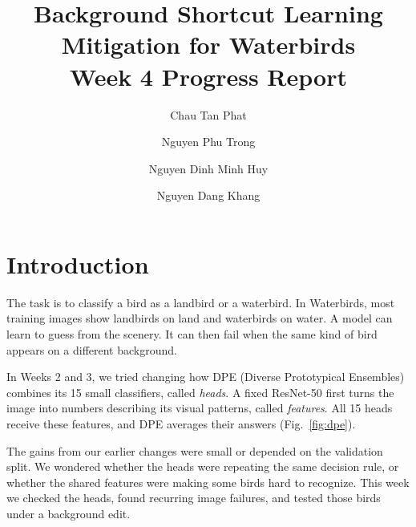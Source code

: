 \documentclass[runningheads]{llncs}
\makeatletter
\newenvironment{methodfigure}{\par\medskip\noindent
  \begin{minipage}{\linewidth}\centering\def\@captype{figure}}
  {\end{minipage}\par\medskip}
\makeatother
\begin{document}
\title{Background Shortcut Learning Mitigation for Waterbirds\texorpdfstring{\\}{: }
Week 4 Progress Report}
\author{Chau Tan Phat \and
Nguyen Phu Trong \and
Nguyen Dinh Minh Huy \and
Nguyen Dang Khang}
\maketitle
\raggedbottom

\section{Introduction}

The task is to classify a bird as a landbird or a waterbird. In Waterbirds,
most training images show landbirds on land and waterbirds on water.
A model can learn to guess from the scenery. It can then fail when the
same kind of bird appears on a different background.

In Weeks 2 and 3, we tried changing how DPE (Diverse Prototypical Ensembles)
combines its 15 small classifiers, called \emph{heads}. A fixed ResNet-50
first turns the image into numbers describing its visual patterns,
called \emph{features}. All 15 heads receive these features, and DPE
averages their answers (Fig.~\ref{fig:dpe}).

\begin{methodfigure}
\resizebox{\linewidth}{!}{}
\caption{DPE uses one shared feature extractor and 15 heads. Changing the
head combination changes how the final answers count.}
\label{fig:dpe}
\end{methodfigure}

The gains from our earlier changes were small or depended on the
validation split. We wondered whether the heads were repeating the same
decision rule, or whether the shared features were making some birds
hard to recognize. This week we checked the heads, found recurring
image failures, and tested those birds under a background edit.
\end{document}
